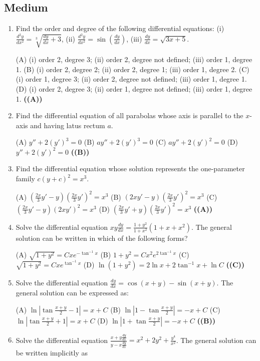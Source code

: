 \documentclass{article}
\begin{document}
\subsection{Medium}
\begin{enumerate}
\item Find the order and degree of the following differential equations:
(i) $\frac{d^{2}y}{dx^{2}} = \sqrt[3]{\frac{dy}{dx} + 3}$, (ii) $\frac{d^{2}y}{dx^{2}} = \sin(\frac{dy}{dx})$, (iii) $\frac{dy}{dx} = \sqrt{3x + 5}$.

(A) (i) order 2, degree 3; (ii) order 2, degree not defined; (iii) order 1, degree 1.
(B) (i) order 2, degree 2; (ii) order 2, degree 1; (iii) order 1, degree 2.
(C) (i) order 1, degree 3; (ii) order 2, degree not defined; (iii) order 1, degree 1.
(D) (i) order 2, degree 3; (ii) order 1, degree not defined; (iii) order 1, degree 1. \hfill \textbf{((A))}
\item Find the differential equation of all parabolas whose axis is parallel to the $x$-axis and having latus rectum $a$.

(A) $y'' + 2(y')^3 = 0$
(B) $ay'' + 2(y')^3 = 0$
(C) $ay'' + 2(y')^2 = 0$
(D) $y'' + 2(y')^2 = 0$ \hfill \textbf{((B))}
\item Find the differential equation whose solution represents the one-parameter family $c (y + c)^2 = x^3$.

(A) $(\frac{2x}{3}y' - y) (\frac{2x}{3}y')^2 = x^3$
(B) $(2xy' - y) (\frac{2x}{3}y')^2 = x^3$
(C) $(\frac{2x}{3}y' - y) (2xy')^2 = x^3$
(D) $(\frac{2x}{3}y' + y) (\frac{2x}{3}y')^2 = x^3$ \hfill \textbf{((A))}
\item Solve the differential equation $xy \frac{dy}{dx} = \frac{1 + y^2}{1 + x^2} (1 + x + x^2)$.
The general solution can be written in which of the following forms?

(A) $\sqrt{1 + y^2} = Cxe^{-\tan^{-1}x}$
(B) $1 + y^2 = Cx^2 e^{2 \tan^{-1} x}$
(C) $\sqrt{1 + y^2} = Cxe^{\tan^{-1} x}$
(D) $\ln(1 + y^2) = 2\ln x + 2\tan^{-1}x + \ln C$ \hfill \textbf{((C))}
\item Solve the differential equation $\frac{dy}{dx} = \cos(x + y) - \sin(x + y)$.
The general solution can be expressed as:

(A) $\ln|\tan \frac{x + y}{2} - 1| = x + C$
(B) $\ln|1 - \tan \frac{x + y}{2}| = -x + C$
(C) $\ln|\tan \frac{x + y}{2} + 1| = x + C$
(D) $\ln|1 + \tan \frac{x + y}{2}| = -x + C$ \hfill \textbf{((B))}
\item Solve the differential equation $\frac{x+y \frac{dy}{dx}}{y-x \frac{dy}{dx}} = x^2 + 2y^2 + \frac{y^4}{x^2}$.
The general solution can be written implicitly as


\end{enumerate}
\end{document}

